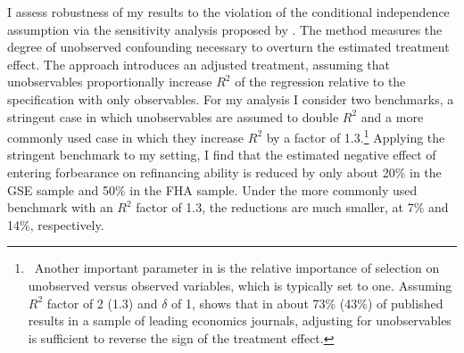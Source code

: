 \documentclass[11pt]{article}
\newcommand{\Javad}[1]{\todo[inline,linecolor=red, backgroundcolor=blue!10!white, bordercolor=red, size=\tiny]{#1}}
\newcommand{\andreas}[1]{\todo[inline,linecolor=blue, backgroundcolor=yellow!20!white, bordercolor=blue, size=\tiny]{#1}}
\begin{document}

I assess robustness of my results to the violation of the conditional independence assumption via the sensitivity analysis proposed by \citet{oster2019}. The method  measures the degree of unobserved confounding necessary to overturn the estimated treatment effect. The approach introduces an adjusted treatment, assuming that unobservables proportionally increase $R^2$ of the regression relative to the specification with only observables. For my analysis I consider two benchmarks, a stringent case in which unobservables are assumed to double $R^2$ and a more commonly used case in which they increase $R^2$ by a factor of 1.3.\footnote{~Another important parameter in \citet{oster2019} is the relative importance of selection on unobserved versus observed variables, which is typically set to one. Assuming  \(R^2\) factor of 2 (1.3) and $\delta$ of 1, \citet{oster2019} shows that in about 73\% (43\%) of published results in a sample of leading economics journals, adjusting for unobservables is sufficient to reverse the sign of the treatment effect.} Applying the stringent benchmark to my setting, I find that the estimated negative effect of entering forbearance on refinancing ability is reduced by only about 20\% in the GSE sample and 50\% in the FHA sample. Under the more commonly used benchmark with an $R^2$ factor of 1.3, the reductions are much smaller, at 7\% and 14\%, respectively. 
\end{document}
